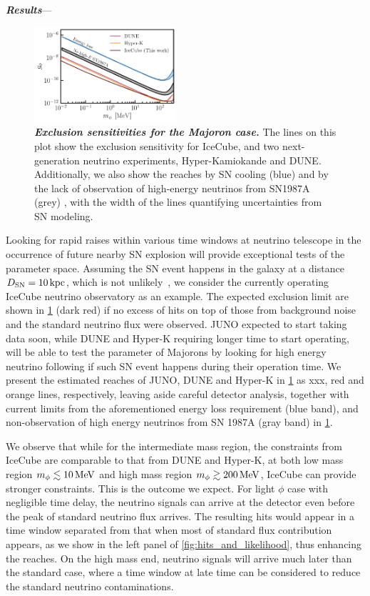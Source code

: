 \textbf{\textit{Results}}---
\begin{figure}[t!]
    \centering
    \includegraphics[width=0.47\textwidth]{figures/majoran_sensitivity}
    \caption{\textbf{\textit{Exclusion sensitivities for the Majoron case.}}
    The lines on this plot show the exclusion sensitivity for IceCube, and two next-generation neutrino experiments, Hyper-Kamiokande and DUNE.
    Additionally, we also show the reaches by SN cooling (blue) and by the lack of observation of high-energy neutrinos from SN1987A (grey) \cite{Fiorillo:2022cdq}, with the width of the lines quantifying uncertainties from SN modeling.
    }
    \label{fig:sensitivity}
\end{figure}
Looking for rapid raises within various time windows at neutrino telescope in the occurrence of future nearby SN explosion will provide exceptional tests of the parameter space. Assuming the SN event happens in the galaxy at a distance $D_{\rm SN}=\unit[10]{kpc}$, which is not unlikely~\cite{Reed:2005en,Rozwadowska:2020nab}, we consider the currently operating IceCube neutrino observatory as an example. 
The expected exclusion limit are shown in \cref{fig:sensitivity} (dark red) if no excess of hits on top of those from background noise and the standard neutrino flux were observed. JUNO expected to start taking data soon, while DUNE and Hyper-K requiring longer time to start operating, will be able to test the parameter of Majorons by looking for high energy neutrino following \cite{Fiorillo:2022cdq} if such SN event happens during their operation time. We present the estimated reaches of JUNO, DUNE and Hyper-K in \cref{fig:sensitivity} as xxx, red and orange lines, respectively, leaving aside careful detector analysis, together with current limits \cite{Fiorillo:2022cdq} from the aforementioned energy loss requirement (blue band), and non-observation of high energy neutrinos from SN 1987A (gray band) in \cref{fig:sensitivity}. 

We observe that while for the intermediate mass region, the constraints from IceCube are comparable to that from DUNE and Hyper-K, at both low mass region $m_\phi \lesssim \unit[10]{MeV}$ and high mass region $m_\phi \gtrsim \unit[200]{MeV}$, IceCube can provide stronger constraints. This is the outcome we expect. For light $\phi$ case with negligible time delay, the neutrino signals can  arrive at the detector even before the peak of standard neutrino flux arrives. The resulting hits would appear in a time window separated from that when most of standard flux contribution appears, as we show in the left panel of \cref{fig:hits_and_likelihood}, thus enhancing the reaches. On the high mass end, neutrino signals will arrive much later than the standard case, where a time window at late time can be considered to reduce the standard neutrino contaminations. 

